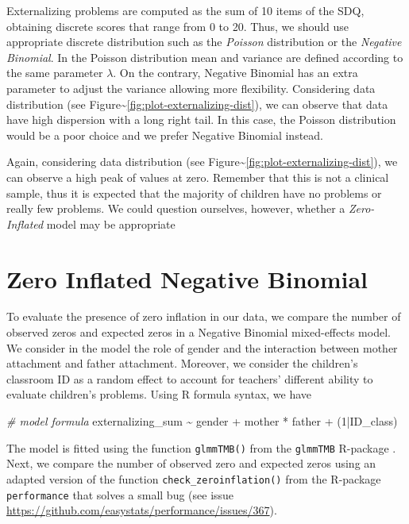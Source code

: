 \documentclass[
]{book}
\newenvironment{Shaded}{\begin{snugshade}}{\end{snugshade}}
\newcommand{\CommentTok}[1]{\textcolor[rgb]{0.56,0.35,0.01}{\textit{#1}}}
\newcommand{\DecValTok}[1]{\textcolor[rgb]{0.00,0.00,0.81}{#1}}
\newcommand{\NormalTok}[1]{#1}
\newcommand{\SpecialCharTok}[1]{\textcolor[rgb]{0.00,0.00,0.00}{#1}}
\begin{document}
Externalizing problems are computed as the sum of 10 items of the SDQ, obtaining discrete scores that range from 0 to 20. Thus, we should use appropriate discrete distribution such as the \emph{Poisson} distribution or the \emph{Negative Binomial}. In the Poisson distribution mean and variance are defined according to the same parameter \(\lambda\). On the contrary, Negative Binomial has an extra parameter to adjust the variance allowing more flexibility. Considering data distribution (see Figure\textasciitilde\ref{fig:plot-externalizing-dist}), we can observe that data have high dispersion with a long right tail. In this case, the Poisson distribution would be a poor choice and we prefer Negative Binomial instead.

Again, considering data distribution (see Figure\textasciitilde\ref{fig:plot-externalizing-dist}), we can observe a high peak of values at zero. Remember that this is not a clinical sample, thus it is expected that the majority of children have no problems or really few problems. We could question ourselves, however, whether a \emph{Zero-Inflated} model may be appropriate

\hypertarget{zero-inflated-negative-binomial}{%
\section{Zero Inflated Negative Binomial}\label{zero-inflated-negative-binomial}}

To evaluate the presence of zero inflation in our data, we compare the number of observed zeros and expected zeros in a Negative Binomial mixed-effects model. We consider in the model the role of gender and the interaction between mother attachment and father attachment. Moreover, we consider the children's classroom ID as a random effect to account for teachers' different ability to evaluate children's problems. Using R formula syntax, we have

\begin{Shaded}
\begin{Highlighting}[]
\CommentTok{\# model formula}
\NormalTok{externalizing\_sum }\SpecialCharTok{\textasciitilde{}}\NormalTok{ gender }\SpecialCharTok{+}\NormalTok{ mother }\SpecialCharTok{*}\NormalTok{ father }\SpecialCharTok{+}\NormalTok{ (}\DecValTok{1}\SpecialCharTok{|}\NormalTok{ID\_class)}
\end{Highlighting}
\end{Shaded}

The model is fitted using the function \texttt{glmmTMB()} from the \texttt{glmmTMB} R-package \citep{brooksGlmmTMBBalancesSpeed2017}. Next, we compare the number of observed zero and expected zeros using an adapted version of the function \texttt{check\_zeroinflation()} from the R-package \texttt{performance} \citep{ludeckePerformancePackageAssessment2021} that solves a small bug (see issue \url{https://github.com/easystats/performance/issues/367}).
\end{document}
